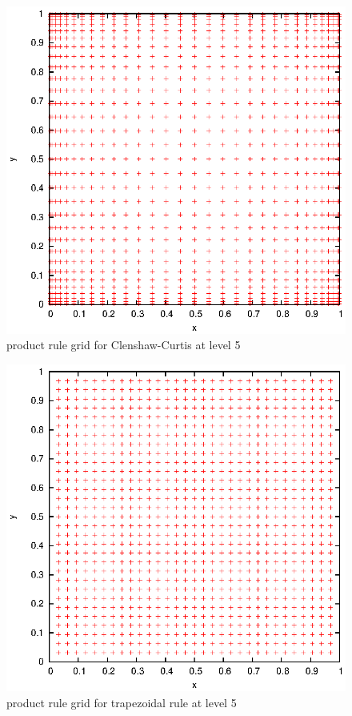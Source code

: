 \documentclass[]{article}
\begin{document}
\begin{figure}[!ht]
\centering
\includegraphics[width=.9\textwidth]{task9_cc}
\caption{product rule grid for Clenshaw-Curtis at level 5}
\label{fig:Task9b}
\end{figure}

\begin{figure}[!ht]
\centering
\includegraphics[width=.9\textwidth]{task9_trapezoidal}
\caption{product rule grid for trapezoidal rule at level 5}
\label{fig:Task9c}
\end{figure}
\clearpage
\end{document}
